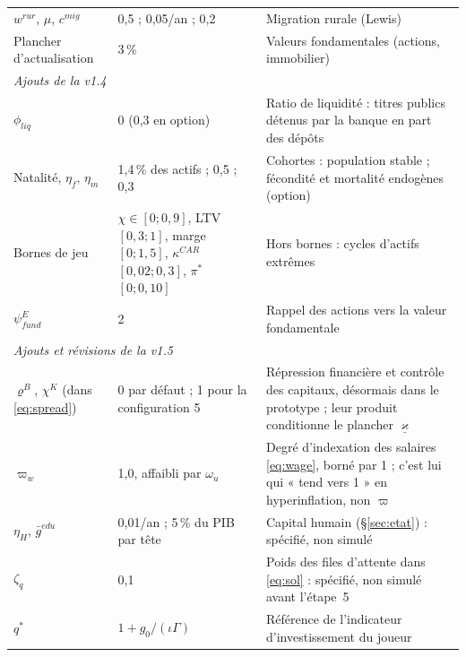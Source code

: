 \documentclass[11pt,a4paper]{article}
\begin{document}
\begin{center}
\begin{longtable}{p{4.2cm}p{3.0cm}p{7.6cm}}
$w^{rur}$, $\mu$, $c^{mig}$ & 0,5 ; 0,05/an ; 0,2 & Migration rurale (Lewis)\\
Plancher d'actualisation & 3\,\% & Valeurs fondamentales (actions, immobilier)\\
\midrule
\multicolumn{3}{l}{\emph{Ajouts de la v1.4}}\\
$\phi_{liq}$ & 0 (0,3 en option) & Ratio de liquidité : titres publics détenus par la banque en part des dépôts\\
Natalité, $\eta_f$, $\eta_m$ & 1,4\,\% des actifs ; 0,5 ; 0,3 & Cohortes : population stable ; fécondité et mortalité endogènes (option)\\
Bornes de jeu & $\chi\in[0;0{,}9]$, LTV $[0{,}3;1]$, marge $[0;1{,}5]$, $\kappa^{CAR}$ $[0{,}02;0{,}3]$, $\pi^\ast$ $[0;0{,}10]$ & Hors bornes : cycles d'actifs extrêmes\\
$\psi^{E}_{fund}$ & 2 & Rappel des actions vers la valeur fondamentale\\
\midrule
\multicolumn{3}{l}{\emph{Ajouts et révisions de la v1.5}}\\
$\varrho^B$, $\chi^K$ (dans \eqref{eq:spread}) & 0 par défaut ; 1 pour la configuration 5 & Répression financière et contrôle des capitaux, désormais dans le prototype ; leur produit conditionne le plancher $\underline\varkappa$\\
$\varpi_w$ & 1,0, affaibli par $\omega_u$ & Degré d'indexation des salaires \eqref{eq:wage}, borné par 1 ; c'est lui qui « tend vers 1 » en hyperinflation, non $\varpi$\\
$\eta_H$, $\bar g^{edu}$ & 0,01/an ; 5\,\% du PIB par tête & Capital humain (\S\ref{sec:etat}) : spécifié, non simulé\\
$\zeta_q$ & 0,1 & Poids des files d'attente dans \eqref{eq:sol} : spécifié, non simulé avant l'étape~5\\
$q^\ast$ & $1+g_0/(\iota\Gamma)$ & Référence de l'indicateur d'investissement du joueur\\
\bottomrule
\end{longtable}
\end{center}
\end{document}
